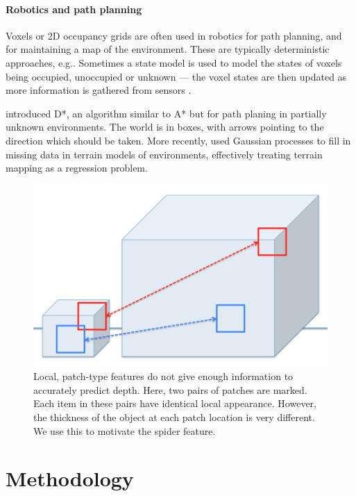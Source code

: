 \documentclass[10pt,twocolumn,letterpaper]{article}
\makeatletter
\renewcommand*{\eg}{e.g.\@\xspace}
\makeatother
\begin{document}
\paragraph{Robotics and path planning}
Voxels or 2D occupancy grids are often used in robotics for path planning, and for maintaining a map of the environment. 
These are typically deterministic approaches, \eg \cite{jetchev-icra-2010}. Sometimes a state model is used to model the states of voxels being occupied, unoccupied or unknown --- the voxel states are then updated as more information is gathered from sensors \cite{toussaint-techreport-2007}.

\cite{stentz-icra-1994} introduced D*, an algorithm similar to A* but for path planing in partially unknown environments. 
The world is in boxes, with arrows pointing to the direction which should be taken.
More recently, \cite{plagemann-iros-2008} used Gaussian processes to fill in missing data in terrain models of environments, effectively treating terrain mapping as a regression problem.




\begin{figure}
  \centering 
  \includegraphics[width=0.9\columnwidth]{patch_sizes.png}
      
  \caption{Local, patch-type features do not give enough information to accurately predict depth. Here, two pairs of patches are marked. Each item in these pairs have identical local appearance. However, the thickness of the object at each patch location is very different. We use this to motivate the spider feature.}
\end{figure}


\section{Methodology}
\end{document}
